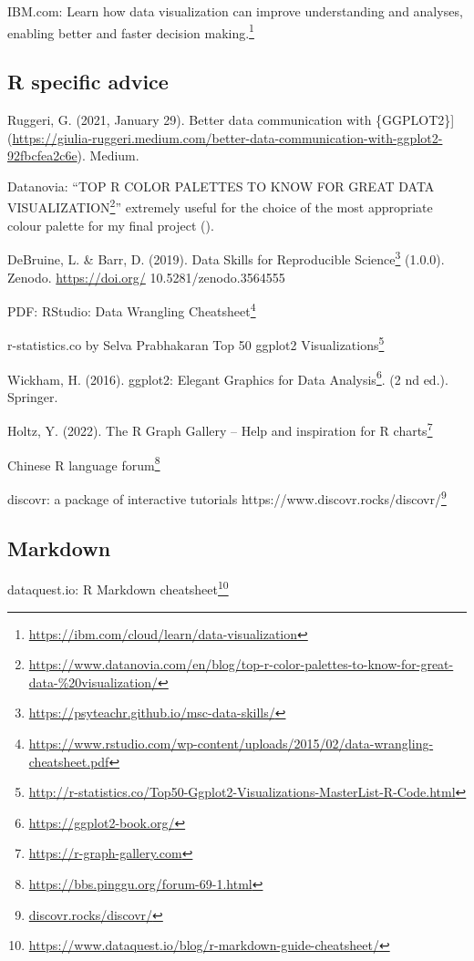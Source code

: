 \documentclass[
  12pt,
  a5paper,
]{book}
\DeclareRobustCommand{\href}[2]{#2\footnote{\url{#1}}}
\begin{document}
IBM.com: \href{https://ibm.com/cloud/learn/data-visualization}{Learn how data visualization can improve understanding and analyses, enabling better and faster decision making.}

\hypertarget{r-specific-advice}{%
\subsection{R specific advice}\label{r-specific-advice}}

Ruggeri, G. (2021, January 29). Better data communication with \{GGPLOT2\}{]}(\url{https://giulia-ruggeri.medium.com/better-data-communication-with-ggplot2-92fbcfea2c6e}). Medium.

Datanovia: ``\href{https://www.datanovia.com/en/blog/top-r-color-palettes-to-know-for-great-data-\%20visualization/}{TOP R COLOR PALETTES TO KNOW FOR GREAT DATA VISUALIZATION}'' extremely useful for the choice of the most appropriate colour palette for my final project ().

DeBruine, L. \& Barr, D. (2019). \href{https://psyteachr.github.io/msc-data-skills/}{Data Skills for Reproducible Science} (1.0.0). Zenodo. \url{https://doi.org/} 10.5281/zenodo.3564555

PDF: RStudio: \href{https://www.rstudio.com/wp-content/uploads/2015/02/data-wrangling-cheatsheet.pdf}{Data Wrangling Cheatsheet}

r-statistics.co by Selva Prabhakaran \href{http://r-statistics.co/Top50-Ggplot2-Visualizations-MasterList-R-Code.html}{Top 50 ggplot2 Visualizations}

Wickham, H. (2016). \href{https://ggplot2-book.org/}{ggplot2: Elegant Graphics for Data Analysis}. (2 nd ed.). Springer.

Holtz, Y. (2022). \href{https://r-graph-gallery.com}{The R Graph Gallery -- Help and inspiration for R charts}

\href{https://bbs.pinggu.org/forum-69-1.html}{Chinese R language forum}

discovr: a package of interactive tutorials \href{discovr.rocks/discovr/}{https://www.discovr.rocks/discovr/}

\hypertarget{markdown}{%
\subsection{Markdown}\label{markdown}}

dataquest.io: \href{https://www.dataquest.io/blog/r-markdown-guide-cheatsheet/}{R Markdown cheatsheet}
\end{document}
